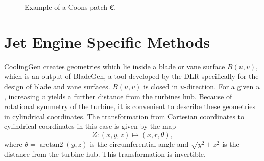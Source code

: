 \documentclass[a4paper, 11pt]{report}
\theoremstyle{definition}
\DeclareMathOperator{\arctantwo}{arctan2}
\begin{document}
	\begin{figure}[H]
		\centering
		
		\caption{Example of a Coons patch $\mathfrak{C}$.}
	\end{figure}

\chapter{Jet Engine Specific Methods}\label{chap:jetenginespecifics}
	CoolingGen creates geometries which lie inside a blade or vane surface $B(u,v)$, which is an output of BladeGen, a tool developed by the DLR specifically for the design of blade and vane surfaces. $B(u,v)$ is closed in $u$-direction. For a given $u$, increasing $v$ yields a further distance from the turbines hub. Because of rotational symmetry of the turbine, it is convenient to describe these geometries in cylindrical coordinates. The transformation from Cartesian coordinates to cylindrical coordinates in this case is given by the map
		$$ Z: (x,y,z) \mapsto (x, r, \theta), $$
	where $\theta = \arctantwo(y, z)$ is the circumferential angle and $\sqrt{y^2+z^2}$ is the distance from the turbine hub. This transformation is invertible.
\end{document}
